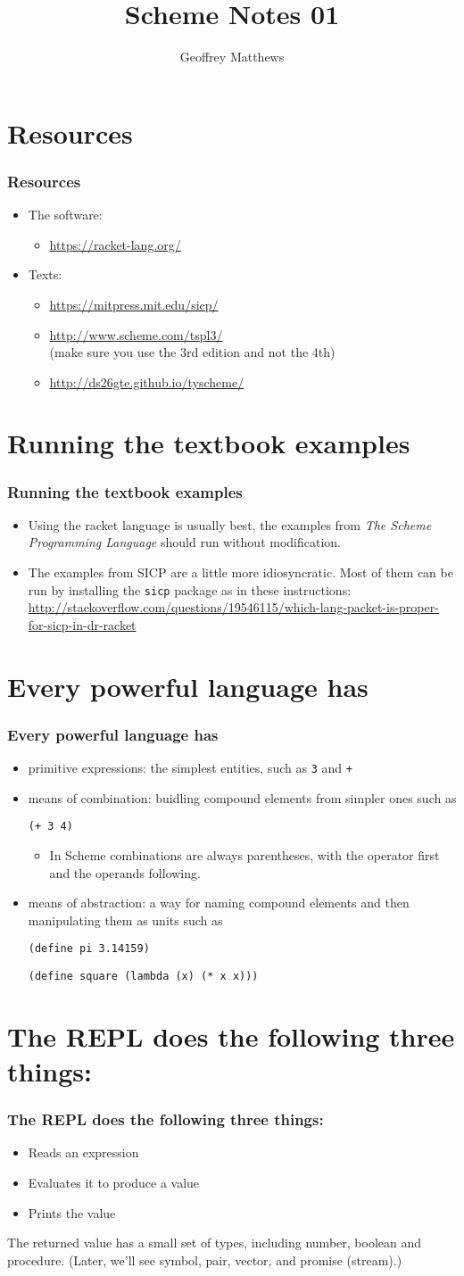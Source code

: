 \documentclass{beamer}
\title
{
Scheme Notes 01
}
\subtitle{
} %
\author[Geoffrey Matthews]
{Geoffrey Matthews}
\institute[WWU/CS]
{
  Department of Computer Science\\
  Western Washington University
}
\newcommand{\sect}[1]{
\section{#1}
\begin{frame}[fragile]\frametitle{#1}
}
\newcommand{\bi}{\begin{itemize}}
\newcommand{\ii}{\item}
\newcommand{\ei}{\end{itemize}}
\begin{document}
\begin{frame}
\titlepage
\end{frame}



\sect{Resources}
\bi
\ii The software:
\bi\ii \url{https://racket-lang.org/}\ei
\ii Texts:
\bi
\ii \url{https://mitpress.mit.edu/sicp/}
\ii \url{http://www.scheme.com/tspl3/}\\ (make sure you use the 3rd
edition and not the 4th)
\ii \url{http://ds26gte.github.io/tyscheme/}
\ei
\ei
\end{frame}


\sect{Running the textbook examples}

\bi
\ii Using the racket language is usually best, the examples from
    {\em The Scheme Programming Language} should run without modification.

 \ii The examples from SICP are a little more idiosyncratic.  Most of
 them can be run by installing the {\tt sicp} package as in
 these instructions:\\
 \url{http://stackoverflow.com/questions/19546115/which-lang-packet-is-proper-for-sicp-in-dr-racket}

 \ei
\end{frame}

\sect{Every powerful language has}


\bi
\ii primitive expressions: the simplest entities, such as \verb|3| and \verb|+|
\ii
means of combination: buidling compound elements from simpler ones such as 

\verb|(+ 3 4)|
\bi
\ii In Scheme combinations are always parentheses, with the operator
first and the operands following.
\ei
\ii
means of abstraction: a way for naming compound elements and then manipulating them as units such as 

\verb|(define pi 3.14159)|

\verb|(define square (lambda (x) (* x x)))|
\ei

\end{frame}

\sect{The REPL does the following three things:}

\bi
\ii Reads an expression
\ii Evaluates it to produce a value
\ii Prints the value
\ei

The returned value has a small set of types, including number, boolean and procedure. (Later, we'll see symbol, pair, vector, and promise (stream).)

\end{frame}
\end{document}
